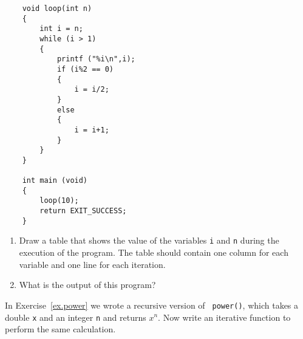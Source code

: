 

\begin{exercise}\label{infloop}
\begin{verbatim}
    void loop(int n) 
    {
        int i = n;
        while (i > 1) 
        {
            printf ("%i\n",i);
            if (i%2 == 0) 
            {
                i = i/2;
            } 
            else 
            {
                i = i+1;
            }
        }
    }

    int main (void) 
    {
        loop(10);
        return EXIT_SUCCESS;
    }
\end{verbatim}
%
\begin{enumerate}

\item  Draw a table that shows the value of the variables {\tt i} and {\tt n} during the execution of the program. 
The table should contain one column for each variable and one line for each iteration.


\item What is the output of this program?

\end{enumerate}
\end{exercise}



\begin{exercise}
In Exercise~\ref{ex.power} we wrote a recursive version of {\tt
power()}, which takes a double {\tt x} and an integer {\tt n} and
returns $x^n$.  Now write an iterative function to perform the same
calculation.
\end{exercise}




